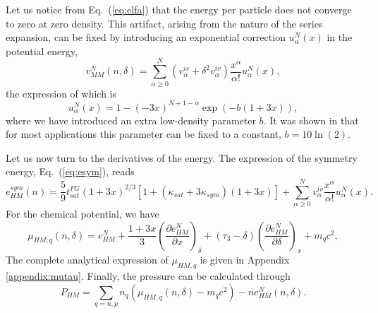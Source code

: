 Let us notice from Eq.~(\ref{eq:elfa}) that the energy per particle does not 
converge to zero at zero density. This artifact, arising from the nature of the 
series expansion, can be fixed by introducing an exponential correction 
$u^N_\alpha(x)$ in the potential energy, 
%
\begin{equation}
  v_{MM}^N(n,\delta) = \sum_{\alpha \geq 0}^N(v_\alpha^{is} +
  \delta^2v_\alpha^{iv})\frac{x^\alpha}{\alpha!}u_\alpha^N(x),\label{eq:mm}
\end{equation}
% 
the expression of which is
%
\begin{equation}
  u_\alpha^N(x) = 1 - (-3x)^{N+1-\alpha}\exp(-b(1+3x)),\label{eq:corr}
\end{equation}
%
where we have introduced an extra low-density parameter $b$. It was shown in
\cite{Antic2019} that for most applications this parameter can be fixed to a
constant, $b=10\ln(2)$.

Let us now turn to the derivatives of the energy. The expression of the 
symmetry energy, Eq.~(\ref{eq:esym}), reads
%
\begin{equation}
  e_{HM}^{sym}(n) =
  \frac{5}{9}t_{sat}^{FG}(1+3x)^{2/3}
  \left[1+(\kappa_{sat}+3\kappa_{sym})(1+3x)\right] + \sum_{\alpha \geq 0}^N
  v_{\alpha}^{iv}\frac{x^{\alpha}}{\alpha!}u_{\alpha}^N(x).\label{eq:esym_exp}
\end{equation}
%
For the chemical potential, we have
%
\begin{equation}
  \mu_{HM,q}(n,\delta) = e_{HM}^N 
  + \frac{1+3x}{3}\left(\frac{\partial e_{HM}^N}{\partial x}\right)_{\delta}
  + (\tau_3 - \delta)\left(\frac{\partial e_{HM}^N}{\partial \delta}\right)_{x} 
  + m_{q} c^2,\label{eq:chempot}
\end{equation}
%
The complete analytical expression of $\mu_{HM,q}$ is given in Appendix 
\ref{appendix:mutau}. Finally, the pressure can be calculated through
%
\begin{equation}
  P_{HM} = \sum_{q=n,p}n_{q}(\mu_{HM,q}(n,\delta) - m_{q}c^2) 
  - ne_{HM}^N(n,\delta).\label{eq:phm}
\end{equation}
%

